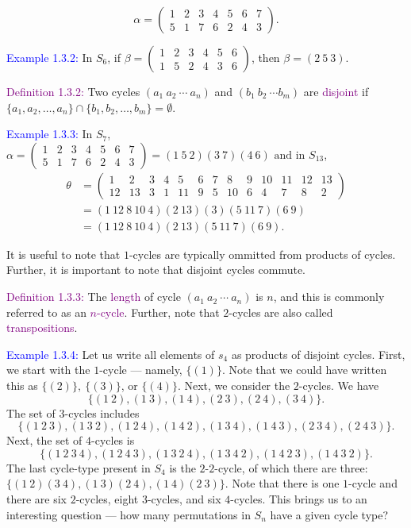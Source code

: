 \documentclass{article}
\begin{document}
\[
    \alpha = \begin{pmatrix}
        1 & 2 & 3 & 4 & 5 & 6 & 7 \\
        5 & 1 & 7 & 6 & 2 & 4 & 3
    \end{pmatrix}.
\]

\textcolor{blue}{Example 1.3.2:} In $S_6$, if $\beta = \begin{pmatrix}
    1 & 2 & 3 & 4 & 5 & 6 \\
    1 & 5 & 2 & 4 & 3 & 6
\end{pmatrix}$, then $\beta = (2 \ 5 \ 3)$. 

\textcolor{purple}{Definition 1.3.2:} Two cycles $(a_1 \ a_2 \ \cdots \ a_n)$ and $(b_1 \ b_2 \ \cdots b_m)$ are 
\textcolor{purple}{disjoint} if $\{a_1, a_2, \dots, a_n\} \cap \{b_1, b_2, \dots, b_m\} = \emptyset$. 

\textcolor{blue}{Example 1.3.3:} In $S_7$, $\alpha = \begin{pmatrix}
    1 & 2 & 3 & 4 & 5 & 6 & 7 \\
    5 & 1 & 7 & 6 & 2 & 4 & 3
\end{pmatrix} = (1 \ 5 \ 2)(3 \ 7)(4 \ 6) \text{ and in } S_{13}$,
\begin{align*}
\theta &= \begin{pmatrix}
        1 & 2 & 3 & 4 & 5 & 6 & 7 & 8 & 9 & 10 & 11 & 12 & 13 \\
        12 & 13 & 3 & 1 & 11 & 9 & 5 & 10 & 6 & 4 & 7 & 8 & 2
    \end{pmatrix} \\
    &= (1 \ 12 \ 8 \ 10 \ 4)(2 \ 13)(3)(5 \ 11 \ 7)(6 \ 9) \\
    &= (1 \ 12 \ 8 \ 10 \ 4)(2 \ 13)(5 \ 11 \ 7)(6 \ 9). 
\end{align*}

It is useful to note that $1$-cycles are typically ommitted from products of cycles. Further, it is important to note that disjoint cycles 
commute.

\textcolor{purple}{Definition 1.3.3:} The \textcolor{purple}{length} of cycle $(a_1 \ a_2 \ \cdots \ a_n)$ is $n$, and this is commonly 
referred to as an \textcolor{purple}{$n$-cycle}. Further, note that $2$-cycles are also called \textcolor{purple}{transpositions}.

\textcolor{blue}{Example 1.3.4:} Let us write all elements of $s_4$ as products of disjoint cycles. First, we start with the $1$-cycle --- 
namely, $\{(1)\}$. Note that we could have written this as $\{(2)\}, \ \{(3)\}$, or $\{(4)\}$. Next, we consider the 
$2$-cycles. We have 
\[
    \{(1 \ 2),(1 \ 3),(1 \ 4),(2 \ 3),(2 \ 4),(3 \ 4)\}.
\]
The set of $3$-cycles includes 
\[
    \{(1 \ 2 \ 3), (1 \ 3 \ 2), (1 \ 2 \ 4), (1 \ 4 \ 2), (1 \ 3 \ 4), (1 \ 4 \ 3), (2 \ 3 \ 4), (2 \ 4 \ 3)\}.
\]
Next, the set of $4$-cycles is 
\[
    \{(1 \ 2 \ 3 \ 4), (1 \ 2 \ 4 \ 3), (1 \ 3 \ 2 \ 4), (1 \ 3 \ 4 \ 2), (1 \ 4 \ 2 \ 3), (1 \ 4 \ 3 \ 2)\}.
\]
The last cycle-type present in $S_4$ is the $2$-$2$-cycle, of which there are three: $\{(1 \ 2)(3 \ 4), (1 \ 3)(2 \ 4), (1 \ 4)(2 \ 3)\}$.
Note that there is one $1$-cycle and there are six $2$-cycles, eight $3$-cycles, and six $4$-cycles. This brings us to 
an interesting question --- how many permutations in $S_n$ have a given cycle type?
\end{document}
